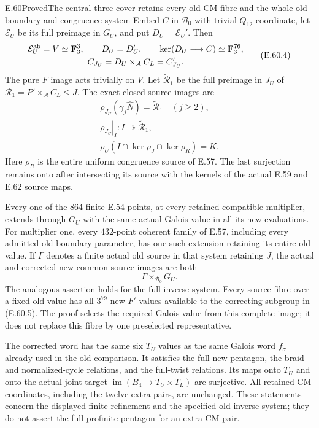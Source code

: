 \begin{statement}{E.60}{Proved}{The central-three cover retains every old CM fibre and the whole old boundary and congruence system}
Embed $C$ in $\mathcal B_0$ with trivial $Q_{12}$ coordinate,
let $\mathcal E_U$ be its full preimage in $G_U$, and put
$D_U=\mathcal E_U'$. Then
\[
 \begin{gathered}
 \mathcal E_U^{\rm ab}=V\simeq\mathbf F_3^3,
 \qquad D_U=D_U',\qquad
 \ker(D_U\longrightarrow C)\simeq\mathbf F_3^{76},\\
 C_{J_U}=D_U\times_{\mathcal A}C_L=C_{J_U}'.
 \end{gathered}
 \tag{E.60.4}
\]
The pure $F$ image acts trivially on $V$.
Let $\widetilde{\mathcal R}_1$ be the full preimage in $J_U$
of $\mathcal R_1=P'\times_{\mathcal A}C_L\leq J$.
The exact closed source images are
\[
 \begin{gathered}
 \rho_{J_U}(\gamma_j\widehat N)=\widetilde{\mathcal R}_1
                          \quad(j\geq2),\\
 \left.\rho_{J_U}\right|_I:I\twoheadrightarrow
                                  \widetilde{\mathcal R}_1,\\
 \rho_U(I\cap\ker\rho_J\cap\ker\rho_R)=K.
 \end{gathered}
 \tag{E.60.5}
\]
Here $\rho_R$ is the entire uniform congruence source of E.57.
The last surjection remains onto after intersecting its source
with the kernels of the actual E.59 and E.62 source maps.

Every one of the $864$ finite E.54 points, at every retained
compatible multiplier, extends through $G_U$ with the same
actual Galois value in all its new evaluations. For multiplier
one, every $432$-point coherent family of E.57, including every
admitted old boundary parameter, has one such extension retaining
its entire old value. If $\Gamma$ denotes a finite actual old
source in that system retaining $J$, the actual and corrected
new common source images are both
\[
                         \Gamma\times_{\mathcal B_0}G_U.
 \tag{E.60.6}
\]
The analogous assertion holds for the full inverse system.
Every source fibre over a fixed old value has all $3^{79}$
new $F'$ values available to the correcting subgroup in
\textup{(E.60.5)}. The proof selects the required Galois value
from this complete image; it does not replace this fibre by
one preselected representative.

The corrected word has the same six $T_U$ values as the same
Galois word $f_\sigma$ already used in the old comparison.
It satisfies the full new pentagon, the braid and normalized-cycle
relations, and the full-twist relations. Its maps onto $T_U$
and onto the actual joint target
$\operatorname{im}(B_4\to T_U\times T_L)$ are surjective.
All retained CM coordinates, including the twelve extra pairs,
are unchanged. These statements concern the displayed finite
refinement and the specified old inverse system; they do not
assert the full profinite pentagon for an extra CM pair.
\end{statement}

